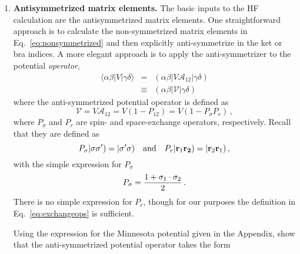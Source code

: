 \documentclass[letterpaper,12pt]{article}
\begin{document}
\begin{enumerate}
\item {\bf Antisymmetrized matrix elements.} The basic inputs to the HF calculation are the antisymmetrized matrix elements. One straightforward approach is to calculate the non-symmetrized matrix elements in Eq.~\ref{eq:nonsymmetrized} and then explicitly anti-symmetrize in the ket or bra indices. A more elegant approach is to apply the anti-symmetrizer to the potential {\em operator}, 
\begin{eqnarray}
\langle \alpha\beta|V|\gamma\delta\rangle &=& (\alpha\beta|V\mathcal{A}_{12}|\gamma\delta) \nonumber\\
&\equiv& (\alpha\beta|\mathcal{V}|\gamma\delta)
\end{eqnarray}
where the anti-symmetrized potential operator is defined as
\begin{equation}
\mathcal{V} = V\mathcal{A}_{12} = V(1-P_{12}) = V(1-P_{\sigma}P_{r})\,,
\end{equation}
where $P_{\sigma}$ and $P_r$ are spin- and space-exchange operators, respectively. Recall that they are defined as
\begin{equation}
\label{eq:exchangeops}
P_{\sigma}|\sigma\sigma') = |\sigma'\sigma) \quad {\rm and}\quad P_{r}|{\bf r}_1{\bf r_2}) = |{\bf r}_2{\bf r}_1)\,, 
\end{equation}
with the simple expression for $P_{\sigma}$ 
\begin{equation}
P_{\sigma}=\frac{1+{\bf\sigma}_1\cdot{\bf\sigma}_2}{2}\,.
\end{equation}
There is no simple expression for $P_r$, though for our purposes the definition in Eq.~\ref{eq:exchangeops} is sufficient. 

Using the expression for the Minnesota potential given in the Appendix, show that the anti-symmetrized potential operator takes the form


\end{enumerate}
\end{document}
